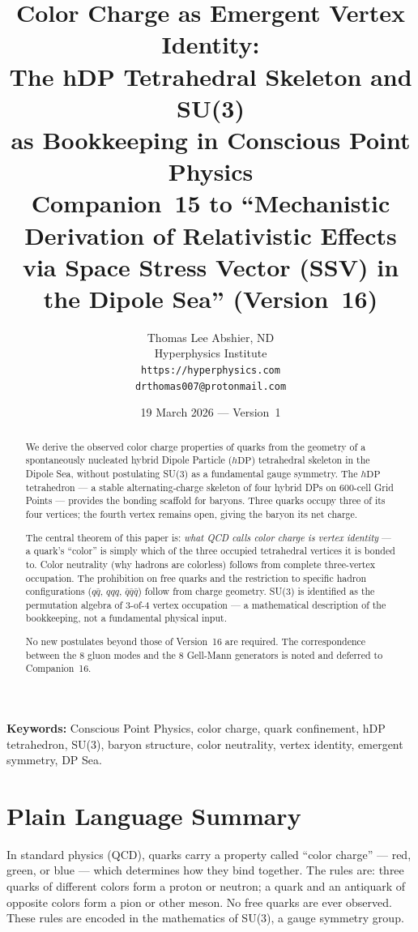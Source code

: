 \documentclass[12pt]{article}
\title{\textbf{Color Charge as Emergent Vertex Identity:\\
The hDP Tetrahedral Skeleton and SU(3)\\
as Bookkeeping in Conscious Point Physics}\\[6pt]
{\large Companion~15 to ``Mechanistic Derivation of Relativistic Effects\\
via Space Stress Vector (SSV) in the Dipole Sea'' (Version~16)}}
\author{Thomas Lee Abshier, ND\\
Hyperphysics Institute\\
\texttt{https://hyperphysics.com}\\
\texttt{drthomas007@protonmail.com}}
\date{19 March 2026 --- Version~1}
\newcommand{\hDP}{h\mathrm{DP}}
\begin{document}
\maketitle

\noindent\textbf{Keywords:} Conscious Point Physics, color charge, quark
confinement, hDP tetrahedron, SU(3), baryon structure, color neutrality,
vertex identity, emergent symmetry, DP Sea.

\begin{abstract}
We derive the observed color charge properties of quarks from the
geometry of a spontaneously nucleated hybrid Dipole Particle ($\hDP$)
tetrahedral skeleton in the Dipole Sea, without postulating SU(3) as a
fundamental gauge symmetry.  The $\hDP$ tetrahedron --- a stable
alternating-charge skeleton of four hybrid DPs on 600-cell Grid Points
--- provides the bonding scaffold for baryons.  Three quarks occupy
three of its four vertices; the fourth vertex remains open, giving the
baryon its net charge.

The central theorem of this paper is: \emph{what QCD calls color charge
is vertex identity} --- a quark's ``color'' is simply which of the three
occupied tetrahedral vertices it is bonded to.  Color neutrality (why
hadrons are colorless) follows from complete three-vertex occupation.
The prohibition on free quarks and the restriction to specific hadron
configurations ($q\bar{q}$, $qqq$, $\bar{q}\bar{q}\bar{q}$) follow
from charge geometry.  SU(3) is identified as the permutation algebra of
3-of-4 vertex occupation --- a mathematical description of the
bookkeeping, not a fundamental physical input.

No new postulates beyond those of Version~16 are required.  The
correspondence between the 8 gluon modes and the 8 Gell-Mann generators
is noted and deferred to Companion~16.
\end{abstract}

\section*{Plain Language Summary}

In standard physics (QCD), quarks carry a property called ``color
charge'' --- red, green, or blue --- which determines how they bind
together.  The rules are: three quarks of different colors form a
proton or neutron; a quark and an antiquark of opposite colors form a
pion or other meson.  No free quarks are ever observed.  These rules
are encoded in the mathematics of SU(3), a gauge symmetry group.
\end{document}
